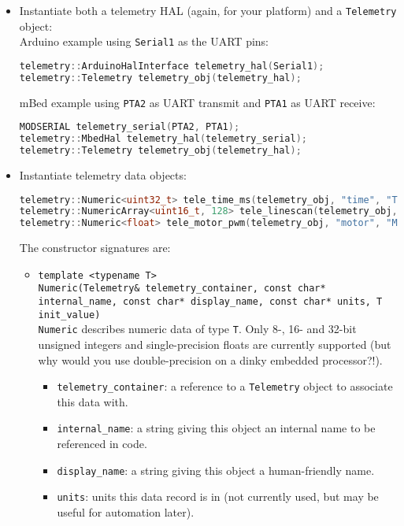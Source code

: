 \documentclass[11pt]{article}
\begin{document}
\begin{itemize}
  \item Instantiate both a telemetry HAL (again, for your platform) and a \texttt{Telemetry} object: \\
  Arduino example using \texttt{Serial1} as the UART pins:
  \begin{lstlisting}[language=C++]
telemetry::ArduinoHalInterface telemetry_hal(Serial1);
telemetry::Telemetry telemetry_obj(telemetry_hal);
  \end{lstlisting}  
  mBed example using \texttt{PTA2} as UART transmit and \texttt{PTA1} as UART receive:
  \begin{lstlisting}[language=C++]
MODSERIAL telemetry_serial(PTA2, PTA1);
telemetry::MbedHal telemetry_hal(telemetry_serial);
telemetry::Telemetry telemetry_obj(telemetry_hal);
  \end{lstlisting}
  \item Instantiate telemetry data objects:
\begin{lstlisting}[language=C++]
telemetry::Numeric<uint32_t> tele_time_ms(telemetry_obj, "time", "Time", "ms", 0);
telemetry::NumericArray<uint16_t, 128> tele_linescan(telemetry_obj, "linescan", "Linescan", "ADC", 0);  
telemetry::Numeric<float> tele_motor_pwm(telemetry_obj, "motor", "Motor PWM", "%DC", 0);
\end{lstlisting}
  The constructor signatures are:
  \begin{itemize}
    \item \texttt{template <typename T>\\ Numeric(Telemetry\& telemetry\_container, const char* internal\_name, const char* display\_name, const char* units, T init\_value)} \\
    \texttt{Numeric} describes numeric data of type \texttt{T}. Only 8-, 16- and 32-bit unsigned integers and single-precision floats are currently supported (but why would you use double-precision on a dinky embedded processor?!).
    \begin{itemize}
      \item \texttt{telemetry\_container}: a reference to a \texttt{Telemetry} object to associate this data with.
      \item \texttt{internal\_name}: a string giving this object an internal name to be referenced in code.
      \item \texttt{display\_name}: a string giving this object a human-friendly name.
      \item \texttt{units}: units this data record is in (not currently used, but may be useful for automation later).

\end{itemize}
\end{itemize}
\end{itemize}
\end{document}
